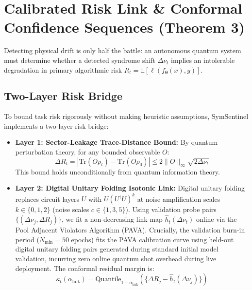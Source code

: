 \documentclass[aps,pra,twocolumn,superscriptaddress,10pt,floatfix]{revtex4-2}
\begin{document}
\section{Calibrated Risk Link \& Conformal Confidence Sequences (Theorem 3)}
\label{sec:certify}
Detecting physical drift is only half the battle: an autonomous quantum system must determine whether a detected syndrome shift $\Delta \nu_t$ implies an intolerable degradation in primary algorithmic risk $R_t = \mathbb{E}[\ell(f_{\boldsymbol{\theta}}(x), y)]$.

\subsection{Two-Layer Risk Bridge}
To bound task risk rigorously without making heuristic assumptions, SymSentinel implements a two-layer risk bridge:
\begin{itemize}
    \item \textbf{Layer 1: Sector-Leakage Trace-Distance Bound:} By quantum perturbation theory, for any bounded observable $O$:
    \begin{equation}
    \Delta R_t = |\mathrm{Tr}(O \rho_t) - \mathrm{Tr}(O \rho_0)| \le 2 \|O\|_\infty \sqrt{2 \Delta \nu_t}
    \label{eq:layer1_bound}
    \end{equation}
    This bound holds unconditionally from quantum information theory.
    \item \textbf{Layer 2: Digital Unitary Folding Isotonic Link:} Digital unitary folding replaces circuit layers $U$ with $U (U^\dagger U)^k$ at noise amplification scales $k \in \{0, 1, 2\}$ (noise scales $c \in \{1, 3, 5\}$). Using validation probe pairs $\{(\Delta \nu_j, \Delta R_j)\}$, we fit a non-decreasing link map $\hat{h}_t(\Delta \nu_t)$ online via the Pool Adjacent Violators Algorithm (PAVA). Crucially, the validation burn-in period ($N_{\mathrm{min}} = 50$ epochs) fits the PAVA calibration curve using held-out digital unitary folding pairs generated during standard initial model validation, incurring zero online quantum shot overhead during live deployment. The conformal residual margin is:
    \begin{equation}
    \kappa_t(\alpha_{\mathrm{link}}) = \text{Quantile}_{1 - \alpha_{\mathrm{link}}}\left( \{\Delta R_j - \hat{h}_t(\Delta \nu_j)\} \right)
    \end{equation}
\end{itemize}
\end{document}
